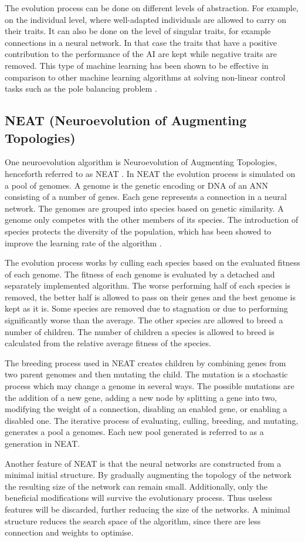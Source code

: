 The evolution process can be done on different levels of abstraction. For example, on the individual level, where well-adapted individuals are allowed to carry on their traits. It can also be done on the level of singular traits, for example connections in a neural network. In that case the traits that have a positive contribution to the performance of the AI are kept while negative traits are removed. This type of machine learning has been shown to be effective in comparison to other machine learning algorithms at solving non-linear control tasks such as the pole balancing problem \cite{gomez:efficient_nonlinear_control}.



\subsection{NEAT (Neuroevolution of Augmenting Topologies)} 
\label{theory:neat}
One neuroevolution algorithm is Neuroevolution of Augmenting Topologies, henceforth referred to as NEAT \cite{ozveren}. In NEAT the evolution process is simulated on a pool of genomes. A genome is the genetic encoding or DNA of an ANN consisting of a number of genes. Each gene represents a connection in a neural network. The genomes are grouped into species based on genetic similarity. A genome only competes with the other members of its species. The introduction of species protects the diversity of the population, which has been showed to improve the learning rate of the algorithm \cite{stanley:neat}.  

The evolution process works by culling each species based on the evaluated fitness of each genome. The fitness of each genome is evaluated by a detached and separately implemented algorithm. The worse performing half of each species is removed, the better half is allowed to pass on their genes and the best genome is kept as it is. Some species are removed due to stagnation or due to performing significantly worse than the average. The other species are allowed to breed a number of children. The number of children a species is allowed to breed is calculated from the relative average fitness of the species. 

The breeding process used in NEAT creates children by combining genes from two parent genomes and then mutating the child. The mutation is a stochastic process which may change a genome in several ways. The possible mutations are the addition of a new gene, adding a new node by splitting a gene into two, modifying the weight of a connection, disabling an enabled gene, or enabling a disabled one. The iterative process of evaluating, culling, breeding, and mutating, generates a pool a genomes. Each new pool generated is referred to as a generation in NEAT.

Another feature of NEAT is that the neural networks are constructed from a minimal initial structure. By gradually augmenting the topology of the network the resulting size of the network can remain small. Additionally, only the beneficial modifications will survive the evolutionary process. Thus useless features will be discarded, further reducing the size of the networks. A minimal structure reduces the search space of the algorithm, since there are less connection and weights to optimise. 
